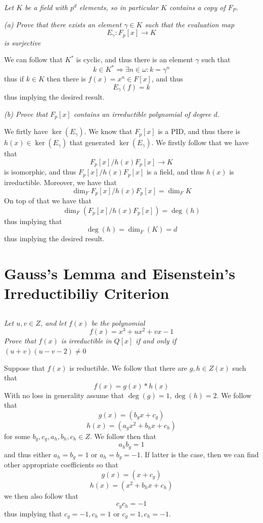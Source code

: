 \documentclass[11pt,oneside,titlepage]{book}
\DeclareMathOperator \ra {\Rightarrow}
\begin{document}
\textit{Let $K$ be a field with $p^d$ elements, so in particular
  $K$ contains a copy of $F_P$.}

\textit{(a) Prove that there exists an element $\gamma \in K$ such
  that the evaluation map
  $$E_\gamma: F_p[x] \to K$$
  is surjective}

We can follow that $K^*$ is cyclic, and thus there is an element
$\gamma$ such that
$$k \in K^* \ra \exists n \in \omega: k = \gamma^n$$
thus if $k \in K$ then there is $f(x) = x^n \in F[x]$, and thus
$$E_\gamma(f) = k$$
thus implying the desired result.

\textit{(b) Prove that $F_p[x]$ contains an irreductible polynomial
  of degree $d$.}

We firtly have $\ker(E_\gamma)$. We know that $F_p[x]$ is a PID, and
thus there is $h(x) \in \ker(E_\gamma)$ that generated
$\ker(E_\gamma)$. We firstly follow that we have that
$$F_p[x]/h(x)F_p[x] \to K$$
is isomorphic, and thus $F_p[x]/h(x)F_p[x]$ is a field, and thus
$h(x)$ is irreductible. Moreover, we have that
$$ \dim_FF_p[x]/h(x)F_p[x] = \dim_F K $$
On top of that we have that
$$\dim_F(F_p[x]/h(x)F_p[x]) = \deg(h) $$
thus implying that
$$\deg(h) = \dim_F(K) = d$$
thus implying the desired result.


\section{Gauss's Lemma and Eisenstein's Irreductibiliy Criterion}

\subsection{}

\textit{Let $u, v \in Z$, and let $f(x)$ be the polynomial
  $$f(x) = x^3 + ux^2 + vx - 1$$
  Prove that $f(x)$ is irreductible in $Q[x]$ if and only if $(u + v)(u
  - v - 2) \neq 0$
}

Suppose that $f(x)$ is reductible. We follow that there are $g, h \in
Z(x)$ such that
$$f(x) = g(x) * h(x)$$
With no loss in generality assume that $\deg(g) = 1, \deg(h) = 2$. We
follow that
$$g(x) = (b_gx + c_g)$$
$$h(x) = (a_gx^2 + b_hx + c_h)$$
for some $b_g, c_g, a_h, b_h, c_h \in Z$. We follow then that
$$a_h b_g = 1$$
and thus either $a_h = b_g = 1$ or $a_h = b_g = -1$. If latter is the
case, then we can find other appropriate coefficients so that
$$g(x) = (x + c_g)$$
$$h(x) = (x^2 + b_hx + c_h)$$
we then also follow that
$$c_g c_h = -1$$
thus implying that $c_g = -1, c_h = 1$ or $c_g = 1, c_h = -1$.
\end{document}
